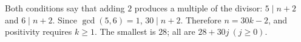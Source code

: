 Both conditions say that adding $2$ produces a multiple of the divisor: $5\mid n+2$ and $6\mid n+2$. Since $\gcd(5,6)=1$, $30\mid n+2$. Therefore $n=30k-2$, and positivity requires $k\ge1$. The smallest is $\boxed{28}$; all are $\boxed{28+30j\ (j\ge0)}$.
